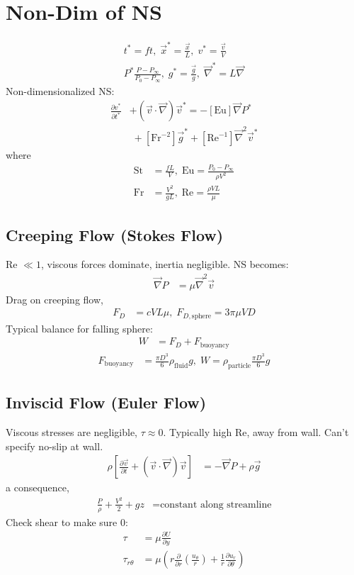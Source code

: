 \section{Non-Dim of NS}
\begin{gather*}
    t^* = ft, \; \vec{x}^* = \frac{\vec{x}}{L}, \; v^* = \frac{\vec{v}}{V} \\
    P^* \frac{P - P_\infty}{P_0 - P_\infty}, \; g^* = \frac{\vec{g}}{g}, \; \vec{\nabla}^* = L \vec{\nabla} 
\end{gather*}
Non-dimensionalized NS:
\begin{align*}
    [\text{St}] \frac{\partial v^*}{\partial t^*} &+ (\vec{v} \cdot \vec{\nabla})\vec{v}^* = - [\text{Eu}] \vec{\nabla} P^*  \\
    & \; + [\text{Fr}^{-2}] \vec{g}^* + [\text{Re}^{-1}] \vec{\nabla}^2 \vec{v}^* 
\end{align*}
where
\begin{align*}
    \text{St} &= \frac{fL}{V}, \; \text{Eu} = \frac{P_0 - P_\infty}{\rho V^2} \\
    \text{Fr} &= \frac{V^2}{gL}, \; \text{Re} = \frac{\rho V L}{\mu}
\end{align*}
\subsection{Creeping Flow (Stokes Flow)}
Re $\ll 1$, viscous forces dominate, inertia negligible. NS becomes:
\begin{align*}
    \vec{\nabla} P &= \mu \vec{\nabla}^2 \vec{v} 
\end{align*}
Drag on creeping flow,
\begin{align*}
    F_D &= c V L \mu, \; F_{D, \text{sphere}} = 3 \pi \mu V D
\end{align*}
Typical balance for falling sphere:
\begin{align*}
    W &= F_D + F_\text{buoyancy}
\end{align*}
\begin{align*}
    F_\text{buoyancy} &= \frac{\pi D^3}{6} \rho_{\text{fluid}} g, \; W = \rho_{\text{particle}} \frac{\pi D^3}{6} g
\end{align*}
\subsection{Inviscid Flow (Euler Flow)}
Viscous stresses are negligible, $\tau \approx 0$. Typically high Re, away from wall. Can't specify no-slip at wall. 
\begin{align*}
    \rho \left[\frac{\partial \vec{v}}{\partial t} + (\vec{v} \cdot \vec{\nabla})\vec{v}\right] &= -\vec{\nabla} P + \rho \vec{g}
\end{align*}
a consequence, 
\begin{align*}
    \frac{P}{\rho} + \frac{V^2}{2} + gz &= \text{constant along streamline}
\end{align*}
Check shear to make sure 0:
\begin{align*}
    \tau &= \mu \frac{\partial U}{\partial y} \\
    \tau_{r \theta} &= \mu \left(r \frac{\partial}{\partial r} \left(\frac{u_\theta}{r}\right) + \frac{1}{r} \frac{\partial u_r}{\partial \theta}\right)
\end{align*}
